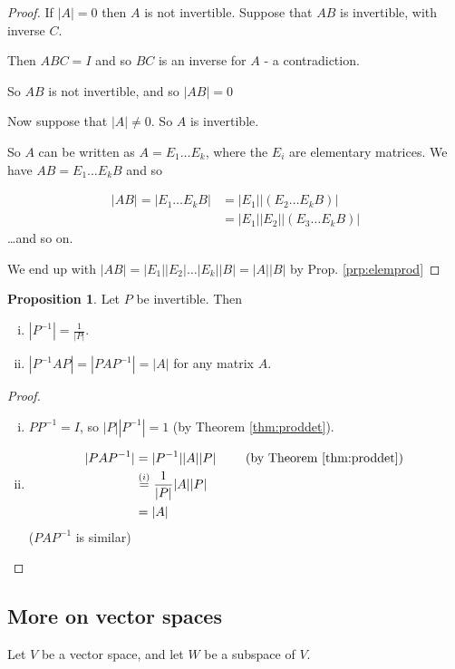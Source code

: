 \documentclass{article}
\theoremstyle{definition} \newtheorem*{definition}{Definition}
\newtheorem{proposition}[theorem]{Proposition}
\newcommand{\Det}[1]{|#1|}
\begin{document}
  \begin{proof}
    If $\Det{A}=0$ then $A$ is not invertible. Suppose that $AB$ is
    invertible, with inverse $C$. 

    Then $ABC=I$ and so $BC$ is an inverse for $A$ - a contradiction.

    So $AB$ is not invertible, and so $\Det{AB}=0$

    Now suppose that $\Det{A}\neq 0$. So $A$ is invertible.

    So $A$ can be written as $A = E_1 \dots E_k$, where the $E_i$
    are elementary matrices. We have $AB = E_1 \dots E_k B$ and so

\begin{align*}
  |AB| = |E_1 \dots E_k B| &= |E_1| |\left( E_2 \dots E_k B\right)| \\
  &= |E_1||E_2||\left( E_3 \dots E_k B \right)|
\end{align*} \dots and so on.

We end up with $|AB| = |E_1||E_2| \dots |E_k| |B| = |A||B|$ by Prop. \ref{prp:elemprod}
  \end{proof}


  \begin{proposition}
    Let $P$ be invertible. Then 
    \begin{enumerate}[(i)]
      \item $|P^{-1}| = \frac{1}{|P|}$.
      \item $|P^{-1}AP| = |PAP^{-1}| = |A|$ for any matrix $A$.
    \end{enumerate}
    \label{prp:pap}
  \end{proposition}

  \begin{proof}\hfill
    \begin{enumerate}[(i)]
      \item $PP^{-1} = I$, so $|P||P^{-1}| = 1$ (by Theorem \ref{thm:proddet}).
      \item 
        \begin{align*}
          |PAP^{-1}| &= |P^{-1}||A||P| 
          \qquad \text{ (by Theorem \ref{thm:proddet}) }\\
          &\overset{(i)}{=} \frac{1}{|P|}|A||P| \\
          &= |A|
        \end{align*} ($PAP^{-1}$ is similar)
    \end{enumerate}
  \end{proof}


  \subsection*{More on vector spaces}
  Let $V$ be a vector space, and let $W$ be a subspace of $V$.
\end{document}
